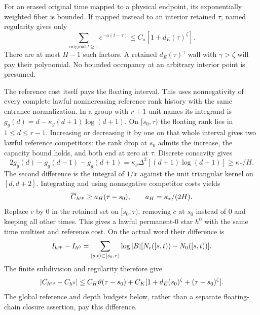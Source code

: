 For an erased original time mapped to a physical endpoint, its
exponentially weighted fiber is bounded. If mapped instead to an
interior retained $\tau$, named regularity gives only
\begin{equation}
 \sum_{\text{original }t\ge\tau}e^{-a(t-\tau)}
          \le C_a[1+d_E(\tau)^\zeta].
 \label{history:terminal-fiber}
\end{equation}
There are at most $H-1$ such factors. A retained $d_E(\tau)^\gamma$
wall with $\gamma>\zeta$ will pay their polynomial. No bounded
occupancy at an arbitrary interior point is presumed.

The reference cost itself pays the floating interval. This uses
nonnegativity of every complete lawful nonincreasing reference rank
history with the same entrance normalization. In a group with $r+1$
unit names its integrand is
$g_g(d)=d-\kappa_g(d+1)\log(d+1)$.
On $[s_0,\tau)$ the floating rank lies in $1\le d\le r-1$.
Increasing or decreasing it by one on that whole interval gives two
lawful reference competitors: the rank drop at $s_0$ admits the
increase, the capacity bound holds, and both end at zero at $\tau$.
Discrete concavity gives
\[
 2g_g(d)-g_g(d-1)-g_g(d+1)
    =\kappa_g\Delta^2[(d+1)\log(d+1)]\ge\kappa_*/H.
\]
The second difference is the integral of $1/x$ against the unit
triangular kernel on $[d,d+2]$. Integrating and using nonnegative
competitor costs yields
\begin{equation}
 \overline C_{h^{\rm sp}}\ge a_H(\tau-s_0),
                      \qquad a_H=\kappa_*/(2H).
 \label{history:floating-reference}
\end{equation}
Replace $c$ by $0$ in the retained set on $[s_0,\tau)$, removing
$c$ at $s_0$ instead of $0$ and keeping all other times. This gives
a lawful permanent-$0$ star $h^0$ with the same time multiset and
reference cost. On the actual word their difference is
\[
 I_{h^{\rm sp}}-I_{h^0}
   =\sum_{[s,t)\subset[s_0,\tau)}\log|B|[N_c([s,t))-N_0([s,t))].
\]
The finite subdivision and regularity therefore give
\begin{equation}
 |C_{h^{\rm sp}}-C_{h^0}|
 \le C_H\vartheta(\tau-s_0)
       +C_K[1+d_E(s_0)^\zeta+(\tau-s_0)^\zeta].
 \label{history:anchor-comparison}
\end{equation}
The global reference and depth budgets below, rather than a separate
floating-chain closure assertion, pay this difference.

